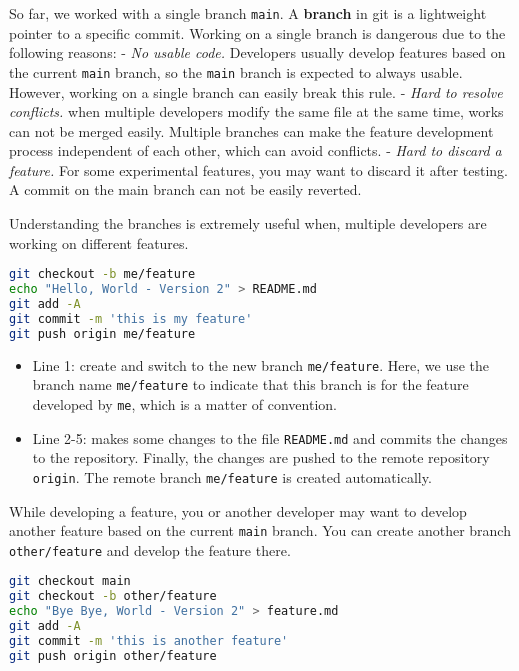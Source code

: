 \documentclass[
  notoc %
]{tufte-book}
\providecommand{\tightlist}{%
  \setlength{\itemsep}{0pt}\setlength{\parskip}{0pt}
}
\newcommand{\passthrough}[1]{#1}
\begin{document}
So far, we worked with a single branch \passthrough{\lstinline!main!}. A
\textbf{branch} in git is a lightweight pointer to a specific commit.
Working on a single branch is dangerous due to the following reasons: -
\emph{No usable code.} Developers usually develop features based on the
current \passthrough{\lstinline!main!} branch, so the
\passthrough{\lstinline!main!} branch is expected to always usable.
However, working on a single branch can easily break this rule. -
\emph{Hard to resolve conflicts.} when multiple developers modify the
same file at the same time, works can not be merged easily. Multiple
branches can make the feature development process independent of each
other, which can avoid conflicts. - \emph{Hard to discard a feature.}
For some experimental features, you may want to discard it after
testing. A commit on the main branch can not be easily reverted.

Understanding the branches is extremely useful when, multiple developers
are working on different features.

\begin{lstlisting}[language=bash]
git checkout -b me/feature
echo "Hello, World - Version 2" > README.md
git add -A
git commit -m 'this is my feature'
git push origin me/feature
\end{lstlisting}

\begin{itemize}
\tightlist
\item
  Line 1: create and switch to the new branch
  \passthrough{\lstinline!me/feature!}. Here, we use the branch name
  \passthrough{\lstinline!me/feature!} to indicate that this branch is
  for the feature developed by \passthrough{\lstinline!me!}, which is a
  matter of convention.
\item
  Line 2-5: makes some changes to the file
  \passthrough{\lstinline!README.md!} and commits the changes to the
  repository. Finally, the changes are pushed to the remote repository
  \passthrough{\lstinline!origin!}. The remote branch
  \passthrough{\lstinline!me/feature!} is created automatically.
\end{itemize}

While developing a feature, you or another developer may want to develop
another feature based on the current \passthrough{\lstinline!main!}
branch. You can create another branch
\passthrough{\lstinline!other/feature!} and develop the feature there.

\begin{lstlisting}[language=bash]
git checkout main
git checkout -b other/feature
echo "Bye Bye, World - Version 2" > feature.md
git add -A
git commit -m 'this is another feature'
git push origin other/feature
\end{lstlisting}
\end{document}
